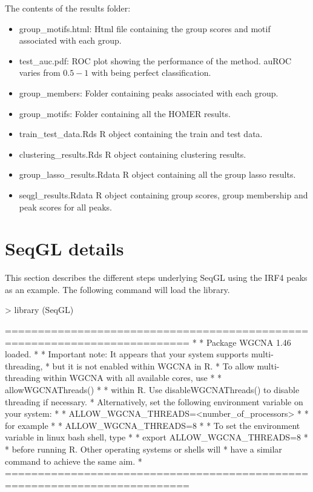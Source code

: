 \documentclass[10pt,oneside]{article}
\begin{document}
\pagebreak

The contents of the results folder:
\begin{itemize}
\item group\_motifs.html: Html file containing the group scores and motif associated with each group.
\item test\_auc.pdf: ROC plot showing the performance of the method. auROC varies from $0.5-1$ with being perfect classification.
\item group\_members: Folder containing peaks associated with each group.
\item group\_motifs: Folder containing all the HOMER results.
\item train\_test\_data.Rds R object containing the train and test data.
\item clustering\_results.Rds R object containing clustering results.
\item group\_lasso\_results.Rdata R object containing all the group lasso results.
\item seqgl_results.Rdata R object containing group scores, group membership and peak scores for all peaks.
\end{itemize}


\section{SeqGL details}
This section describes the different steps underlying SeqGL using the IRF4 peaks as an example. The following command will load the library.
\begin{Schunk}
\begin{Sinput}
> library (SeqGL)
\end{Sinput}
\begin{Soutput}
==========================================================================
*
*  Package WGCNA 1.46 loaded.
*
*    Important note: It appears that your system supports multi-threading,
*    but it is not enabled within WGCNA in R. 
*    To allow multi-threading within WGCNA with all available cores, use 
*
*          allowWGCNAThreads()
*
*    within R. Use disableWGCNAThreads() to disable threading if necessary.
*    Alternatively, set the following environment variable on your system:
*
*          ALLOW_WGCNA_THREADS=<number_of_processors>
*
*    for example 
*
*          ALLOW_WGCNA_THREADS=8
*
*    To set the environment variable in linux bash shell, type 
*
*           export ALLOW_WGCNA_THREADS=8
*
*     before running R. Other operating systems or shells will
*     have a similar command to achieve the same aim.
*
==========================================================================
\end{Soutput}
\end{Schunk}
\end{document}
